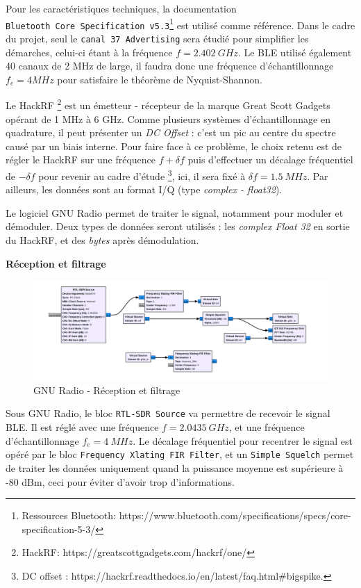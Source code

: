 Pour les caractéristiques techniques, la documentation
\texttt{Bluetooth\ Core\ Specification\ v5.3}\footnote{Ressources
  Bluetooth:
  https://www.bluetooth.com/specifications/specs/core-specification-5-3/}
est utilisé comme référence. Dans le cadre du projet, seul le
\texttt{canal\ 37\ Advertising} sera étudié pour simplifier les
démarches, celui-ci étant à la fréquence \(f = 2.402 \ GHz\). Le BLE
utilisé également 40 canaux de 2 MHz de large, il faudra donc une
fréquence d'échantillonnage \(f_{e} = 4 MHz\) pour satisfaire le
théorème de Nyquist-Shannon.

Le HackRF \footnote{HackRF: https://greatscottgadgets.com/hackrf/one/}
est un émetteur - récepteur de la marque Great Scott Gadgets opérant de
1 MHz à 6 GHz. Comme plusieurs systèmes d'échantillonnage en quadrature,
il peut présenter un \emph{DC Offset} : c'est un pic au centre du
spectre causé par un biais interne. Pour faire face à ce problème, le
choix retenu est de régler le HackRF sur une fréquence \(f + \delta f\)
puis d'effectuer un décalage fréquentiel de \(-\delta f\) pour revenir
au cadre d'étude \footnote{DC offset :
  https://hackrf.readthedocs.io/en/latest/faq.html\#bigspike.}, ici, il
sera fixé à \(\delta f = 1.5 \ MHz\). Par ailleurs, les données sont au
format I/Q (type \emph{complex - float32}).

Le logiciel GNU Radio permet de traiter le signal, notamment pour
moduler et démoduler. Deux types de données seront utilisés : les
\emph{complex Float 32} en sortie du HackRF, et des \emph{bytes} après
démodulation.

\textbf{Réception et filtrage}

\begin{figure}
\centering
\includegraphics{static/ble-rx-filt.png}
\caption{GNU Radio - Réception et filtrage}
\end{figure}

Sous GNU Radio, le bloc \texttt{RTL-SDR\ Source} va permettre de
recevoir le signal BLE. Il est réglé avec une fréquence
\(f = 2.0435 \ GHz\), et une fréquence d'échantillonnage
\(f_e = 4 \ MHz\). Le décalage fréquentiel pour recentrer le signal est
opéré par le bloc \texttt{Frequency\ Xlating\ FIR\ Filter}, et un
\texttt{Simple\ Squelch} permet de traiter les données uniquement quand
la puissance moyenne est supérieure à -80 dBm, ceci pour éviter d'avoir
trop d'informations.


